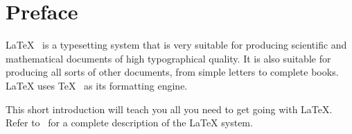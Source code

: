 %
%
%
%



\chapter{Preface}

\LaTeX{}~\cite{manual} is a typesetting system that is very
suitable for producing scientific and mathematical documents of high
typographical quality. It is also suitable for producing all
sorts of other documents, from simple letters to complete books.
\LaTeX{} uses \TeX{}~\cite{texbook} as its formatting engine.

This short introduction will teach you all you need to get going with \LaTeX. Refer to~\cite{manual,companion} for
a complete description of the \LaTeX{} system.

